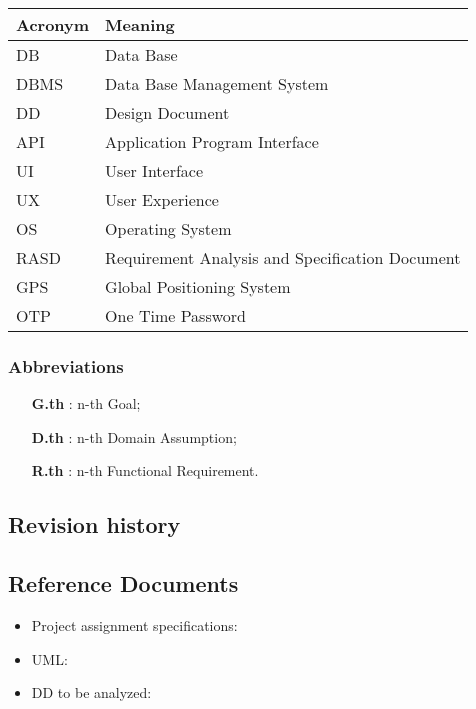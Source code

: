 \begin{tabular}{|l|l|}
\hline
Acronym & Meaning \\ \hline
DB & Data Base \\ \hline
DBMS & Data Base Management System \\ \hline
DD & Design Document \\ \hline
API & Application Program Interface \\ \hline
UI & User Interface \\ \hline
UX & User Experience \\ \hline
OS & Operating System \\ \hline
RASD & Requirement Analysis and Specification Document \\ \hline
GPS & Global Positioning System \\ \hline
OTP & One Time Password \\ 
\hline


\end{tabular}

\subsubsection{Abbreviations}

\begin{itemize}

\item [\textbf{G.th}]: n-th Goal;

\item [\textbf{D.th}]: n-th Domain Assumption;

\item [\textbf{R.th}]: n-th Functional Requirement.

\end{itemize}


\subsection{Revision history}


\subsection{Reference Documents}

\begin{itemize}

\item Project assignment specifications:\cite{ASSIGNMENT}

\item UML: \cite{UML}

\item DD to be analyzed: \cite{DD}

\end{itemize}


